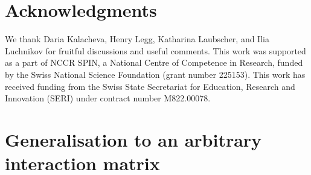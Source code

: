 \documentclass[reprint, aps, prx, amsmath, amssymb, longbibliography, superscriptaddress]{revtex4-2}
\DeclareMathOperator{\Zthree}{\mathbb{Z}_3}
\begin{document}

\section*{Acknowledgments} 

We thank Daria Kalacheva, Henry Legg, Katharina Laubscher, and Ilia Luchnikov for fruitful discussions and useful comments. This work was supported as a part of NCCR SPIN, a National Centre of Competence in Research, funded by the Swiss National Science Foundation (grant number 225153). This work has received funding from the Swiss State Secretariat for Education, Research and Innovation (SERI) under contract number M822.00078.


\appendix

\section{Generalisation to an arbitrary interaction matrix}
\label{app:arbitrary-interaction-summary}
\end{document}
